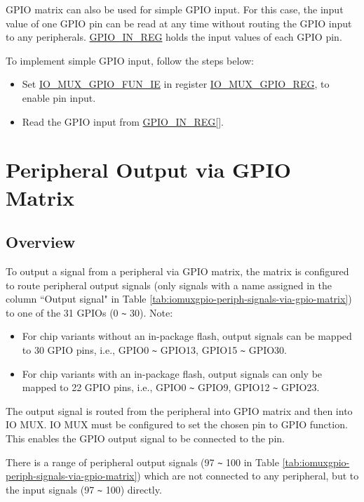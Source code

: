 \documentclass[main\_\_EN.tex]{subfiles}
\begin{document}
GPIO matrix can also be used for simple GPIO input. For this case, the input value of one GPIO pin can be read at any time without routing the GPIO input to any peripherals. \hyperref[regdesc:GPIOINREG]{GPIO\_IN\_REG} holds the input values of each GPIO pin.

To implement simple GPIO input, follow the steps below:
\begin{itemize}
    \item Set  \hyperref[fielddesc:IOMUXGPIONFUNIE]{IO\_MUX\_GPIO\_FUN\_IE} in register  \hyperref[regdesc:IOMUXGPIONREG]{IO\_MUX\_GPIO\_REG}, to enable pin input.
    \item Read the GPIO input from  \hyperref[regdesc:GPIOINREG]{GPIO\_IN\_REG[]}.
\end{itemize}

\section{Peripheral Output via GPIO Matrix}
\label{sec:peripheral-output-via-gpio-matrix}

\subsection{Overview}

To output a signal from a peripheral via GPIO matrix, the matrix is configured to route peripheral output signals (only signals with a name assigned in the column ``Output signal" in Table \ref{tab:iomuxgpio-periph-signals-via-gpio-matrix}) to one of the 31 GPIOs (0 \verb+~+ 30). Note:
\begin{itemize}
    \item For chip variants without an in-package flash, output signals can be mapped to 30 GPIO pins, i.e., GPIO0 \verb+~+ GPIO13, GPIO15 \verb+~+ GPIO30. 
    \item For chip variants with an in-package flash, output signals can only be mapped to 22 GPIO pins, i.e., GPIO0 \verb+~+ GPIO9, GPIO12 \verb+~+ GPIO23.
\end{itemize}

The output signal is routed from the peripheral into GPIO matrix and then into IO MUX. IO MUX must be configured to set the chosen pin to GPIO function. This enables the GPIO output signal to be connected to the pin.

\begin{tiplisting}
There is a range of peripheral output signals (97 \verb+~+ 100 in Table  \ref{tab:iomuxgpio-periph-signals-via-gpio-matrix}) which are not connected to any peripheral, but to the input signals (97 \verb+~+ 100) directly.
\end{tiplisting}
\vspace{-2em}
\end{document}
